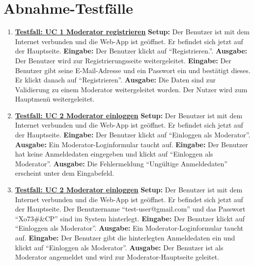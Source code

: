 \section{Abnahme-Testfälle}
\begin{enumerate}
	\item \underline{\textbf{Testfall: UC 1 Moderator registrieren}} \linebreak
	\textbf{Setup:} Der Benutzer ist mit dem Internet verbunden und die Web-App ist geöffnet. Er befindet sich jetzt auf der Hauptseite.\linebreak
	\textbf{Eingabe:} Der Benutzer klickt auf ``Registrieren.''.\linebreak
	\textbf{Ausgabe:} Der Benutzer wird zur Registrierungsseite weitergeleitet.\linebreak
	\textbf{Eingabe:} Der Benutzer gibt seine E-Mail-Adresse und ein Passwort ein und bestätigt dieses. Er klickt danach auf ``Registrieren''. \linebreak
	\textbf{Ausgabe:} Die Daten sind zur Validierung zu einem Moderator weitergeleitet worden. Der Nutzer wird zum Hauptmenü weitergeleitet.
	
	\item \underline{\textbf{Testfall: UC 2 Moderator einloggen}} \linebreak
	\textbf{Setup:} Der Benutzer ist mit dem Internet verbunden und die Web-App ist geöffnet. Er befindet sich jetzt auf der Hauptseite. \linebreak
	\textbf{Eingabe:} Der Benutzer klickt auf ``Einloggen als Moderator''. \linebreak
	\textbf{Ausgabe:} Ein Moderator-Loginformular taucht auf.\linebreak
	\textbf{Eingabe:} Der Benutzer hat keine Anmeldedaten eingegeben und klickt auf ``Einloggen als Moderator''.\linebreak
	\textbf{Ausgabe:} Die Fehlermeldung ``Ungültige Anmeldedaten'' erscheint unter dem Eingabefeld.
	
	\item \underline{\textbf{Testfall: UC 2 Moderator einloggen}} \linebreak
	\textbf{Setup:} Der Benutzer ist mit dem Internet verbunden und die Web-App ist geöffnet. Er befindet sich jetzt auf der Hauptseite. Der Benutzername ``test-user@gmail.com'' und das Passwort ``Xo73\#\&CP'' sind im System hinterlegt. \linebreak
	\textbf{Eingabe:} Der Benutzer klickt auf ``Einloggen als Moderator''. \linebreak
	\textbf{Ausgabe:} Ein Moderator-Loginformular taucht auf.\linebreak
	\textbf{Eingabe:} Der Benutzer gibt die hinterlegten Anmeldedaten ein und klickt auf ``Einloggen als Moderator''.\linebreak
	\textbf{Ausgabe:} Der Benutzer ist als Moderator angemeldet und wird zur Moderator-Hauptseite geleitet.
	

\end{enumerate}
